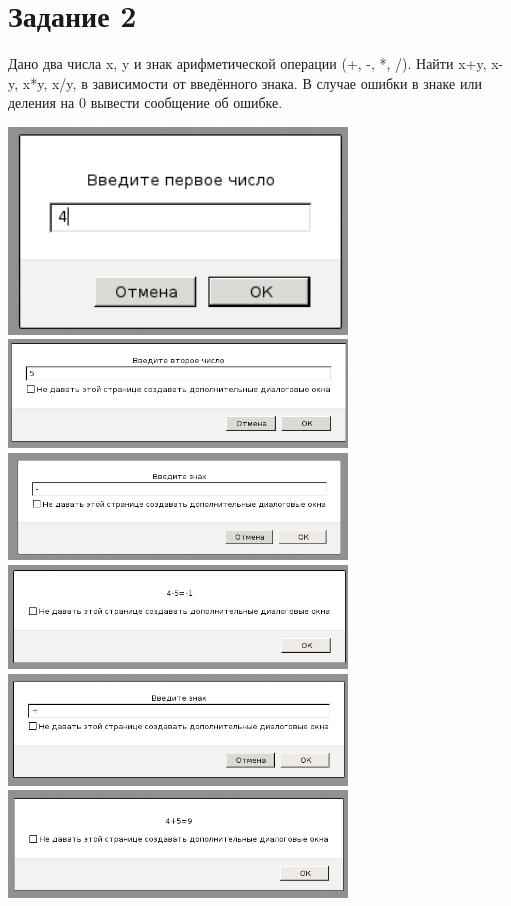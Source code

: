 \section{Задание 2}

Дано два числа x, y и знак арифметической операции (+, -, *, /). Найти x+y, x-y, x*y, x/y, в зависимости от введённого знака. В случае ошибки в знаке или деления на 0 вывести сообщение об ошибке.

\begin{center} 
  \includegraphics[width=9cm]{img/0201.png}
  \includegraphics[width=9cm]{img/0202.png}
  \includegraphics[width=9cm]{img/0203.png}
  \includegraphics[width=9cm]{img/0204.png}
  \includegraphics[width=9cm]{img/0205.png}
  \includegraphics[width=9cm]{img/0206.png}

\end{center}
